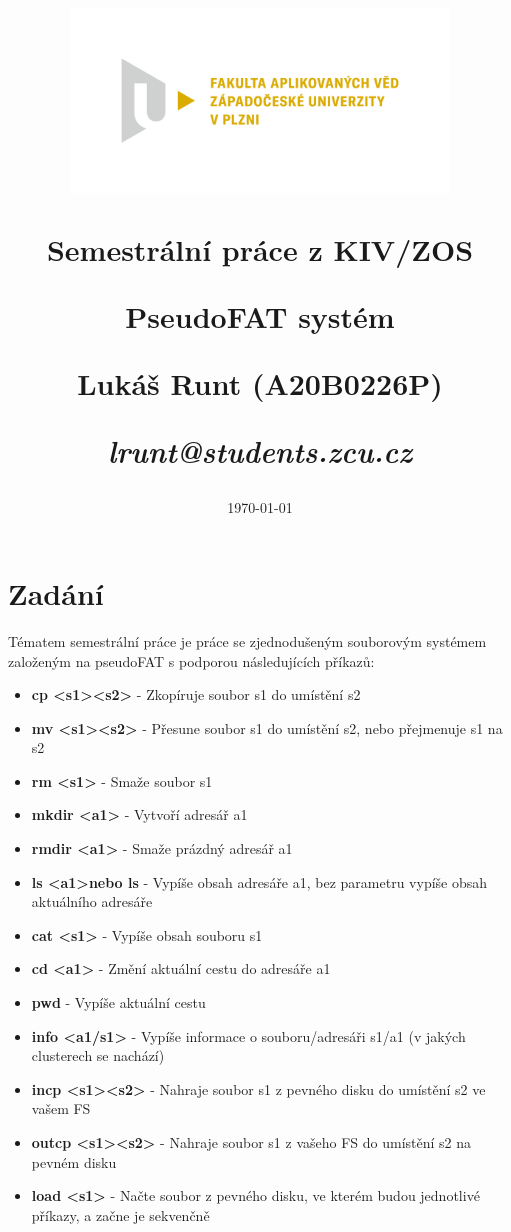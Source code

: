 \documentclass[12pt, a4paper]{article}
\title{\includegraphics[width=10cm]{FAV_cmyk}

{\huge Semestrální práce z KIV/ZOS}

\vspace{0.5cm}
{\LARGE PseudoFAT systém}
\vspace{1cm} 

\Large Lukáš Runt (A20B0226P)
\vspace{0.5cm} 

\large \itshape lrunt@students.zcu.cz
}
\date{\vspace{6cm} \today}
\begin{document}
\begin{titlepage}
\clearpage\maketitle
\thispagestyle{empty}
\end{titlepage}
\tableofcontents \newpage

\section{Zadání}
    Tématem semestrální práce je práce se zjednodušeným souborovým systémem založeným na pseudoFAT s podporou následujících příkazů:

    \begin{itemize}
        \item \textbf{cp \textless s1\textgreater \textless s2\textgreater } - Zkopíruje soubor s1 do umístění s2 
        \item \textbf{mv \textless s1\textgreater \textless s2\textgreater } - Přesune soubor s1 do umístění s2, nebo přejmenuje s1 na s2
        \item \textbf{rm \textless s1\textgreater } - Smaže soubor s1
        \item \textbf{mkdir \textless a1\textgreater } - Vytvoří adresář a1
        \item \textbf{rmdir \textless a1\textgreater } - Smaže prázdný adresář a1
        \item \textbf{ls \textless a1\textgreater nebo ls} - Vypíše obsah adresáře a1, bez parametru vypíše obsah aktuálního adresáře
        \item \textbf{cat \textless s1\textgreater } - Vypíše obsah souboru s1
        \item \textbf{cd \textless a1\textgreater } - Změní aktuální cestu do adresáře a1
        \item \textbf{pwd} - Vypíše aktuální cestu
        \item \textbf{info \textless a1/s1\textgreater } - Vypíše informace o souboru/adresáři s1/a1 (v jakých clusterech se nachází)
        \item \textbf{incp \textless s1\textgreater \textless s2\textgreater } - Nahraje soubor s1 z pevného disku do umístění s2 ve vašem FS
        \item \textbf{outcp \textless s1\textgreater \textless s2\textgreater } - Nahraje soubor s1 z vašeho FS do umístění s2 na pevném disku
        \item \textbf{load \textless s1\textgreater } - Načte soubor z pevného disku, ve kterém budou jednotlivé příkazy, a začne je sekvenčně

\end{itemize}
\end{document}
